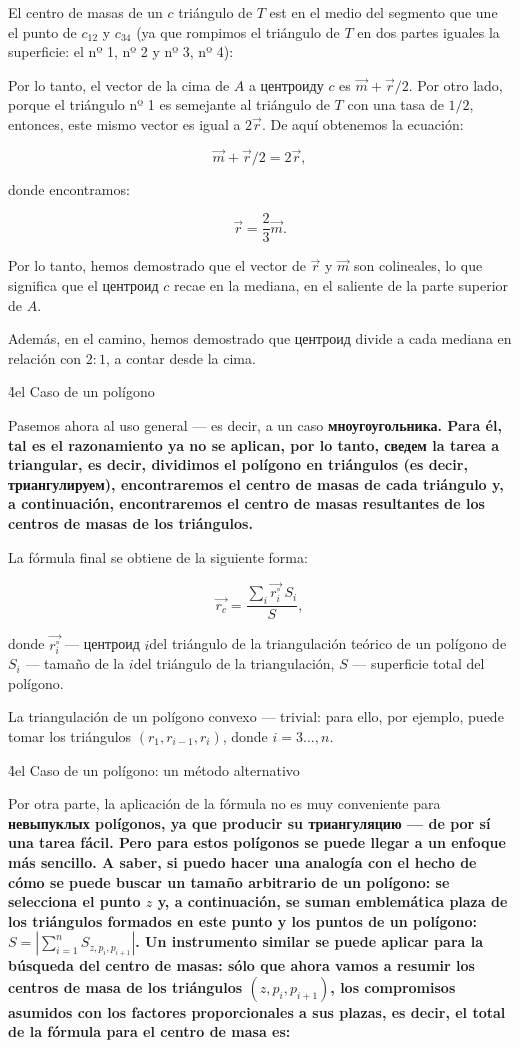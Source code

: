 El centro de masas de un $c$ triángulo de $T$ est en el medio del segmento que une el punto de $c_{12}$ y $c_{34}$ (ya que rompimos el triángulo de $T$ en dos partes iguales la superficie: el nº 1, nº 2 y nº 3, nº 4):


Por lo tanto, el vector de la cima de $A$ a центроиду $c$ es $\vec{m} + \vec{r}/2$. Por otro lado, porque el triángulo nº 1 es semejante al triángulo de $T$ con una tasa de $1/2$, entonces, este mismo vector es igual a $2 \vec{r}$. De aquí obtenemos la ecuación:

$$ \vec{m} + \vec{r}/2 = 2 \vec{r}, $$

donde encontramos:

$$ \vec{r} = \frac{2}{3} \vec{m}. $$

Por lo tanto, hemos demostrado que el vector de $\vec{r}$ y $\vec{m}$ son colineales, lo que significa que el центроид $c$ recae en la mediana, en el saliente de la parte superior de $A$.

Además, en el camino, hemos demostrado que центроид divide a cada mediana en relación con $2:1$, a contar desde la cima.



\h4{el Caso de un polígono}

Pasemos ahora al uso general --- es decir, a un caso \bf{мноугоугольника}. Para él, tal es el razonamiento ya no se aplican, por lo tanto, сведем la tarea a triangular, es decir, dividimos el polígono en triángulos (es decir, триангулируем), encontraremos el centro de masas de cada triángulo y, a continuación, encontraremos el centro de masas resultantes de los centros de masas de los triángulos.

La fórmula final se obtiene de la siguiente forma:

$$ \vec{r_c} = \frac{ \sum\limits_i \vec{r_i^\circ} ~ S_i }{ S }, $$

donde $\vec{r_i^\circ}$ --- центроид $i$del triángulo de la triangulación teórico de un polígono de $S_i$ --- tamaño de la $i$del triángulo de la triangulación, $S$ --- superficie total del polígono.

La triangulación de un polígono convexo --- trivial: para ello, por ejemplo, puede tomar los triángulos $(r_1,r_{i-1},r_i)$, donde $i = 3 \ldots, n$.

\h4{el Caso de un polígono: un método alternativo}

Por otra parte, la aplicación de la fórmula no es muy conveniente para \bf{невыпуклых polígonos}, ya que producir su триангуляцию --- de por sí una tarea fácil. Pero para estos polígonos se puede llegar a un enfoque más sencillo. A saber, si puedo hacer una analogía con el hecho de cómo se puede buscar un tamaño arbitrario de un polígono: se selecciona el punto $z$ y, a continuación, se suman emblemática plaza de los triángulos formados en este punto y los puntos de un polígono: $S = |\sum_{i=1}^n S_{z,p_i,p_{i+1}}|$. Un instrumento similar se puede aplicar para la búsqueda del centro de masas: sólo que ahora vamos a resumir los centros de masa de los triángulos $(z,p_i,p_{i+1})$, los compromisos asumidos con los factores proporcionales a sus plazas, es decir, el total de la fórmula para el centro de masa es:

